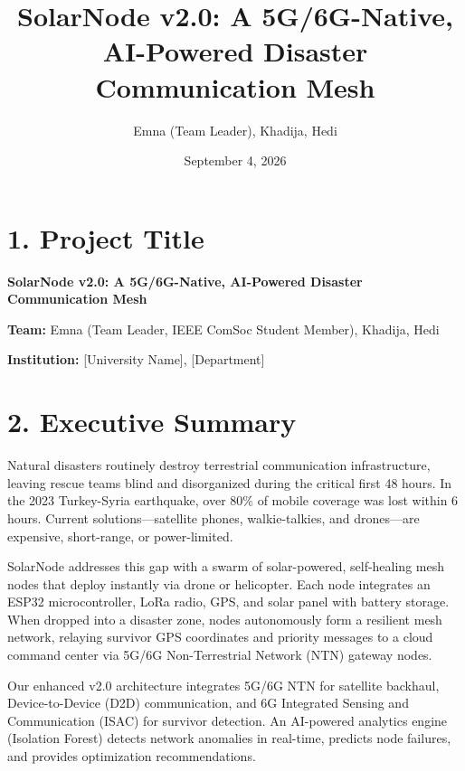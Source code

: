 \documentclass[12pt,a4paper]{article}
\title{\textbf{SolarNode v2.0: A 5G/6G-Native, AI-Powered Disaster Communication Mesh}}
\author{Emna (Team Leader), Khadija, Hedi}
\date{September 4, 2026}
\begin{document}
\maketitle
\thispagestyle{empty}
\newpage

\section*{1. Project Title}

\textbf{SolarNode v2.0: A 5G/6G-Native, AI-Powered Disaster Communication Mesh}

\vspace{0.3cm}
\textbf{Team:} Emna (Team Leader, IEEE ComSoc Student Member), Khadija, Hedi

\vspace{0.3cm}
\textbf{Institution:} [University Name], [Department]

\section*{2. Executive Summary}

Natural disasters routinely destroy terrestrial communication infrastructure, leaving rescue teams blind and disorganized during the critical first 48 hours. In the 2023 Turkey-Syria earthquake, over 80\% of mobile coverage was lost within 6 hours. Current solutions—satellite phones, walkie-talkies, and drones—are expensive, short-range, or power-limited.

SolarNode addresses this gap with a swarm of solar-powered, self-healing mesh nodes that deploy instantly via drone or helicopter. Each node integrates an ESP32 microcontroller, LoRa radio, GPS, and solar panel with battery storage. When dropped into a disaster zone, nodes autonomously form a resilient mesh network, relaying survivor GPS coordinates and priority messages to a cloud command center via 5G/6G Non-Terrestrial Network (NTN) gateway nodes.

Our enhanced v2.0 architecture integrates 5G/6G NTN for satellite backhaul, Device-to-Device (D2D) communication, and 6G Integrated Sensing and Communication (ISAC) for survivor detection. An AI-powered analytics engine (Isolation Forest) detects network anomalies in real-time, predicts node failures, and provides optimization recommendations.
\end{document}
